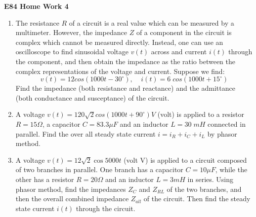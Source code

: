 \usepackage{html}

\begin{center}
{\Large \bf E84 Home Work 4}
\end{center}
\begin{enumerate}

\item The resistance $R$ of a circuit is a real value which can be measured
by a multimeter. However, the impedance $Z$ of a component in the circuit is 
complex which cannot be measured directly. Instead, one can use an oscilloscope 
to find sinusoidal voltage $v(t)$ across and current $i(t)$ through the component,
and then obtain the impedance as the ratio between the complex representations of 
the voltage and current. Suppose we find:
\[ v(t)=12 cos(1000t-30^\circ),\;\;\;\; i(t)=6\;cos(1000t+15^\circ) \]
Find the impedance (both resistance and reactance) and the admittance (both
conductance and susceptance) of the circuit.


\item A voltage $v(t)=120\sqrt{2} cos(1000t+90^\circ) V$ (volt) is applied to 
a resistor $R=15\Omega$, a capacitor $C=83.3\mu F$ and an inductor $L=30\; mH$ 
connected in parallel. Find the over all steady state current $i=i_R+i_C+i_L$ 
by phasor method.


\item A voltage $v(t)=12\sqrt{2} \cos 5000 t$ (volt V) is applied to a circuit
composed of two branches in parallel. One branch has a capacitor $C=10\mu F$,
while the other has a resistor $R=20\Omega$ and an inductor $L=3 mH$ in series.
Using phasor method, find the impedances $Z_C$ and $Z_{RL}$ of the two branches,
and then the overall combined impedance $Z_{all}$ of the circuit. Then find
the steady state current $i(t)$ through the circuit.


\end{enumerate}
